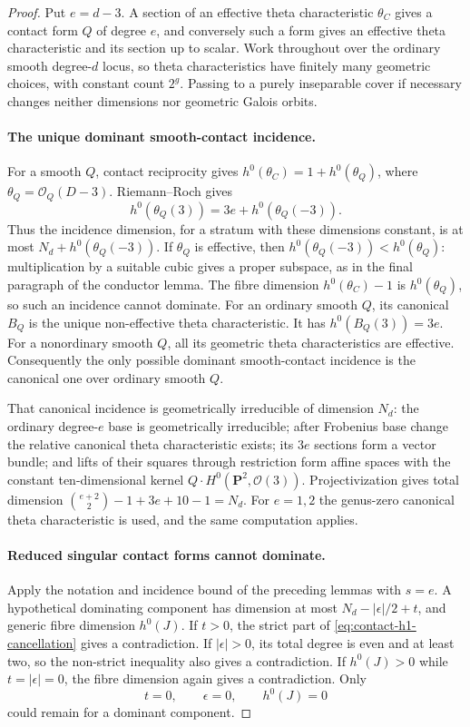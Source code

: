 \begin{proof}
Put $e=d-3$.  A section of an effective theta characteristic
$\theta_C$ gives a contact form $Q$ of degree $e$, and conversely
such a form gives an effective theta characteristic and its
section up to scalar.  Work throughout over the ordinary smooth
degree-$d$ locus, so theta characteristics have finitely many
geometric choices, with constant count $2^g$.  Passing to a
purely inseparable cover if necessary changes neither dimensions
nor geometric Galois orbits.

\paragraph{The unique dominant smooth-contact incidence.}
For a smooth $Q$, contact reciprocity gives
$h^0(\theta_C)=1+h^0(\theta_Q)$, where
$\theta_Q=\mathcal O_Q(D-3)$.
Riemann--Roch gives
\[
 h^0(\theta_Q(3))=3e+h^0(\theta_Q(-3)).
\]
Thus the incidence dimension, for a stratum with these dimensions
constant, is at most $N_d+h^0(\theta_Q(-3))$.
If $\theta_Q$ is effective, then
$h^0(\theta_Q(-3))<h^0(\theta_Q)$: multiplication by a suitable
cubic gives a proper subspace, as in the final paragraph of the
conductor lemma.  The fibre dimension $h^0(\theta_C)-1$
is $h^0(\theta_Q)$, so such an incidence cannot dominate.
For an ordinary smooth $Q$, its canonical $B_Q$ is the unique
non-effective theta characteristic.  It has
$h^0(B_Q(3))=3e$.  For a nonordinary smooth $Q$, all its geometric
theta characteristics are effective.  Consequently the only
possible dominant smooth-contact incidence is the canonical one
over ordinary smooth $Q$.

That canonical incidence is geometrically irreducible of dimension
$N_d$: the ordinary degree-$e$ base is geometrically irreducible;
after Frobenius base change the relative canonical theta
characteristic exists; its $3e$ sections form a vector bundle;
and lifts of their squares through restriction form affine spaces
with the constant ten-dimensional kernel
$Q\cdot H^0(\mathbf P^2,\mathcal O(3))$.
Projectivization gives total dimension
$\binom{e+2}{2}-1+3e+10-1=N_d$.
For $e=1,2$ the genus-zero canonical theta characteristic is used,
and the same computation applies.

\paragraph{Reduced singular contact forms cannot dominate.}
Apply the notation and incidence bound of the preceding lemmas
with $s=e$.  A hypothetical dominating component has dimension
at most $N_d-|\epsilon|/2+t$, and generic fibre dimension
$h^0(J)$.  If $t>0$, the strict part of
\eqref{eq:contact-h1-cancellation} gives a contradiction.
If $|\epsilon|>0$, its total degree is even and at least two,
so the non-strict inequality also gives a contradiction.
If $h^0(J)>0$ while $t=|\epsilon|=0$, the fibre dimension again
gives a contradiction.  Only
\[
 t=0,\qquad \epsilon=0,\qquad h^0(J)=0
\]
could remain for a dominant component.


\end{proof}
